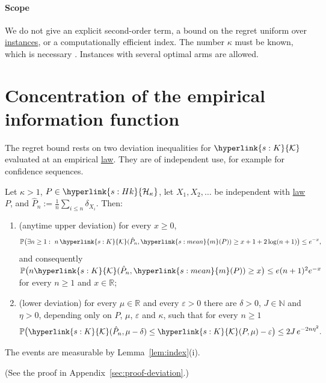 \documentclass[11pt]{article}
\newcommand{\Prob}{\mathbb{P}}
\newcommand{\R}{\mathbb{R}}
\newcommand{\sy}[2]{{\hyperlink{#1}{#2}}}
\newcommand{\term}[2]{\hyperlink{#1}{#2}}
\newcommand{\mean}{\sy{s:mean}{m}}
\newcommand{\Hk}{\sy{s:Hk}{\mathcal{H}_{\kappa}}}
\newcommand{\Kc}{\sy{s:K}{\mathcal{K}}}
\begin{document}
\paragraph{Scope} We do not give an explicit second-order term, a bound on the regret uniform over
\term{w:instance}{instances}, or a computationally efficient index. The number $\kappa$ must be known, which is necessary
\citep[Theorem~7]{L17}. Instances with several optimal arms are allowed.

\section{Concentration of the empirical information function}\label{sec:concentration}

The regret bound rests on two deviation inequalities for $\Kc$ evaluated at an empirical \term{w:law}{law}. They are of
independent use, for example for confidence sequences.

\begin{theorem}\label{thm:deviation}
Let $\kappa>1$, $P\in\Hk$, let $X_1,X_2,\dots$ be independent with \term{w:law}{law} $P$, and
$\hat P_n:=\frac1n\sum_{i\le n}\delta_{X_i}$. Then:
\begin{enumerate}[label=(\roman*)]
  \item (anytime upper deviation) for every $x\ge0$,
  \begin{equation}\label{eq:upper-dev}
    \Prob\bigl(\exists n\ge1:\ n\,\Kc(\hat P_n,\mean(P))\ge x+1+2\log(n+1)\bigr)\le e^{-x},
  \end{equation}
  and consequently $\Prob\bigl(n\Kc(\hat P_n,\mean(P))\ge x\bigr)\le e(n+1)^2e^{-x}$ for every $n\ge1$ and $x\in\R$;
  \item (lower deviation) for every $\mu\in\R$ and every $\varepsilon>0$ there are $\delta>0$, $J\in\mathbb N$ and
  $\eta>0$, depending only on $P$, $\mu$, $\varepsilon$ and $\kappa$, such that for every $n\ge1$
  \begin{equation}\label{eq:lower-dev}
    \Prob\bigl(\Kc(\hat P_n,\mu-\delta)\le\Kc(P,\mu)-\varepsilon\bigr)\le2J\,e^{-2n\eta^2}.
  \end{equation}
\end{enumerate}
The events are measurable by Lemma~\ref{lem:index}(i).
\end{theorem}

(See the proof in Appendix~\ref{sec:proof-deviation}.)
\end{document}

